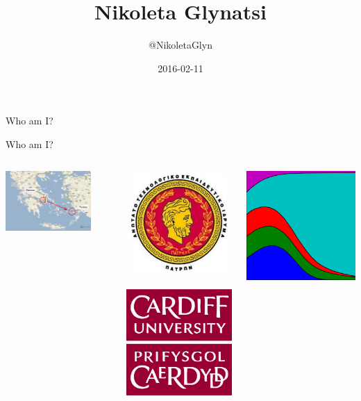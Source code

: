 \documentclass{beamer}
\title{Nikoleta Glynatsi}
\author{@NikoletaGlyn}
\date{2016-02-11}
\begin{document}
\frame{\titlepage}

\begin{frame}
	\begin{center}
		\huge{Who am I?}
	\end{center}
\end{frame}

\begin{frame}{Who am I?}
\begin{columns}[T] %
\begin{column}{.58\textwidth}
  		\includegraphics[width=0.8\textwidth]{static/kos-island-map.png}
\end{column}%
\begin{column}{.38\textwidth}
  		\includegraphics[width=.30\textwidth]{static/tei-patras-logo.jpg}

  		\includegraphics[width=.30\textwidth]{static/cardiff_uni_logo.jpg}
\end{column}%
\begin{column}{.38\textwidth}
  		\includegraphics[width=.30\textwidth]{static/axelrod-logo.png}


\end{column}
\end{columns}
\end{frame}
\end{document}
